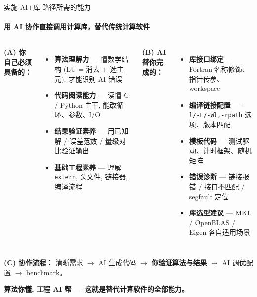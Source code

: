 \documentclass[12pt,aspectratio=169]{beamer}
\begin{document}
\begin{frame}[shrink]{实施 AI+库 路径所需的能力}
\framesubtitle{用 AI 协作直接调用计算库，替代传统计算软件}

\footnotesize
\begin{columns}[T]
\textbf{(A) 你自己必须具备的：}
\begin{itemize}\itemsep1pt
  \item \textbf{算法理解力} — 懂数学结构 (LU = 消去 + 选主元), 才能识别 AI 错误
  \item \textbf{代码阅读能力} — 读懂 C / Python 主干, 能改循环、参数、I/O
  \item \textbf{结果验证素养} — 用已知解 / 误差范数 / 量级对比验证输出
  \item \textbf{基础工程素养} — 理解 \texttt{extern}, 头文件, 链接器, 编译流程
\end{itemize}

\textbf{(B) AI 替你完成的：}
\begin{itemize}\itemsep1pt
  \item \textbf{库接口绑定} — Fortran 名称修饰、指针传参、workspace
  \item \textbf{编译链接配置} — \texttt{-l/-L/-Wl,-rpath} 选项、版本匹配
  \item \textbf{模板代码} — 测试驱动、计时框架、随机矩阵
  \item \textbf{错误诊断} — 链接报错 / 接口不匹配 / segfault 定位
  \item \textbf{库选型建议} — MKL / OpenBLAS / Eigen 各自适用场景
\end{itemize}
\end{columns}

\vspace{4pt}
\small
\textbf{(C) 协作流程：} 清晰需求 $\to$ AI 生成代码 $\to$ \textbf{你验证算法与结果} $\to$ AI 调优配置 $\to$ benchmark。

\vspace{2pt}
\begin{center}
\textbf{算法你懂, 工程 AI 帮 — 这就是替代计算软件的全部能力。}
\end{center}
\end{frame}
\end{document}
